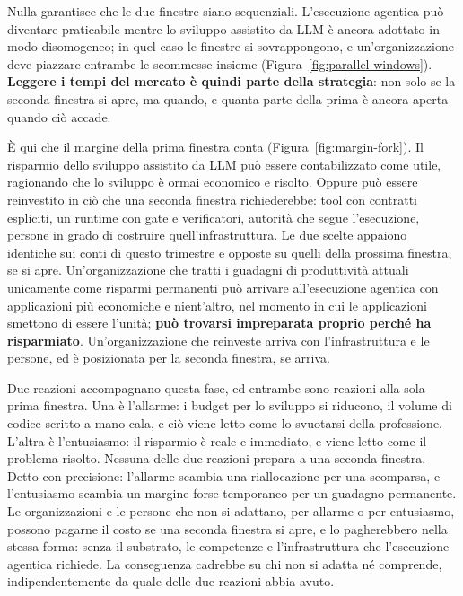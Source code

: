 \documentclass[10pt,oneside,openany]{book}
\begin{document}
Nulla garantisce che le due finestre siano sequenziali. L'esecuzione agentica può diventare praticabile mentre lo sviluppo assistito da LLM è ancora adottato in modo disomogeneo; in quel caso le finestre si sovrappongono, e un'organizzazione deve piazzare entrambe le scommesse insieme (Figura~\ref{fig:parallel-windows}). \textbf{Leggere i tempi del mercato è quindi parte della strategia}: non solo se la seconda finestra si apre, ma quando, e quanta parte della prima è ancora aperta quando ciò accade.


È qui che il margine della prima finestra conta (Figura~\ref{fig:margin-fork}). Il risparmio dello sviluppo assistito da LLM può essere contabilizzato come utile, ragionando che lo sviluppo è ormai economico e risolto. Oppure può essere reinvestito in ciò che una seconda finestra richiederebbe: tool con contratti espliciti, un runtime con gate e verificatori, autorità che segue l'esecuzione, persone in grado di costruire quell'infrastruttura. Le due scelte appaiono identiche sui conti di questo trimestre e opposte su quelli della prossima finestra, se si apre. Un'organizzazione che tratti i guadagni di produttività attuali unicamente come risparmi permanenti può arrivare all'esecuzione agentica con applicazioni più economiche e nient'altro, nel momento in cui le applicazioni smettono di essere l'unità; \textbf{può trovarsi impreparata proprio perché ha risparmiato}. Un'organizzazione che reinveste arriva con l'infrastruttura e le persone, ed è posizionata per la seconda finestra, se arriva.

Due reazioni accompagnano questa fase, ed entrambe sono reazioni alla sola prima finestra. Una è l'allarme: i budget per lo sviluppo si riducono, il volume di codice scritto a mano cala, e ciò viene letto come lo svuotarsi della professione. L'altra è l'entusiasmo: il risparmio è reale e immediato, e viene letto come il problema risolto. Nessuna delle due reazioni prepara a una seconda finestra. Detto con precisione: l'allarme scambia una riallocazione per una scomparsa, e l'entusiasmo scambia un margine forse temporaneo per un guadagno permanente. Le organizzazioni e le persone che non si adattano, per allarme o per entusiasmo, possono pagarne il costo se una seconda finestra si apre, e lo pagherebbero nella stessa forma: senza il substrato, le competenze e l'infrastruttura che l'esecuzione agentica richiede. La conseguenza cadrebbe su chi non si adatta né comprende, indipendentemente da quale delle due reazioni abbia avuto.
\end{document}
